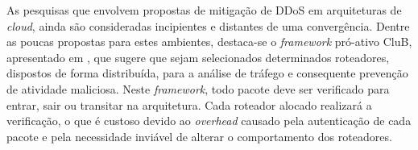 

As pesquisas que envolvem propostas de mitigação de DDoS em arquiteturas de \emph{cloud}, ainda são consideradas incipientes e distantes de uma convergência. Dentre as poucas propostas para estes ambientes, destaca-se o \emph{framework} pró-ativo CluB, apresentado em \cite{Hazelhurst:2008:SCU:1456659.1456671}, que %
sugere
que sejam selecionados determinados roteadores, dispostos de forma distribuída, para a análise de tráfego e consequente prevenção de atividade maliciosa. %
Neste \emph{framework}, todo pacote %
 deve ser verificado para entrar, sair ou transitar na arquitetura. Cada roteador alocado realizará a verificação, o que é custoso devido ao \emph{overhead} causado pela autenticação de cada pacote e pela necessidade inviável de alterar o comportamento dos roteadores. %

